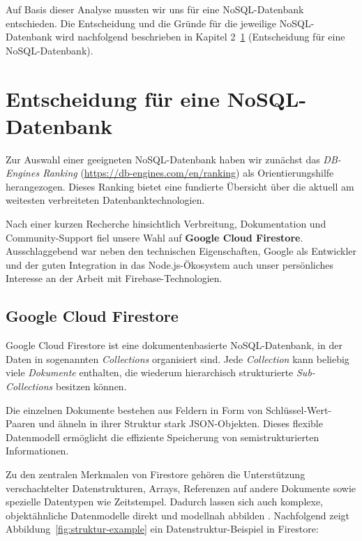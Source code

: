 \documentclass[12pt,a4paper%
              ,oneside     %
              ,titlepage
              ,DIV=13
              ,headinclude
              ,footinclude=false%
              ,cleardoublepage=empty%
              ,parskip=half,
              BCOR=0mm,
              ]{scrreprt}
\begin{document}
Auf Basis dieser Analyse mussten wir uns für eine NoSQL-Datenbank entschieden. Die Entscheidung und die Gründe für die jeweilige NoSQL-Datenbank wird nachfolgend beschrieben in Kapitel 2~\ref{entscheidung-chapter} (\glqq Entscheidung für eine NoSQL-Datenbank\grqq{}).

\chapter{Entscheidung für eine NoSQL-Datenbank}
\label{entscheidung-chapter}

Zur Auswahl einer geeigneten NoSQL-Datenbank haben wir zunächst das \textit{DB-Engines Ranking} (\url{https://db-engines.com/en/ranking}) als Orientierungshilfe herangezogen. Dieses Ranking bietet eine fundierte Übersicht über die aktuell am weitesten verbreiteten Datenbanktechnologien.

Nach einer kurzen Recherche hinsichtlich Verbreitung, Dokumentation und Community-Support fiel unsere Wahl auf \textbf{Google Cloud Firestore}. Ausschlaggebend war neben den technischen Eigenschaften, Google als Entwickler und der guten Integration in das Node.js-Ökosystem auch unser persönliches Interesse an der Arbeit mit Firebase-Technologien.

\section{Google Cloud Firestore}

Google Cloud Firestore ist eine dokumentenbasierte NoSQL-Datenbank, in der Daten in sogenannten \textit{Collections} organisiert sind. Jede \textit{Collection} kann beliebig viele \textit{Dokumente} enthalten, die wiederum hierarchisch strukturierte \textit{Sub-Collections} besitzen können. 

Die einzelnen Dokumente bestehen aus Feldern in Form von Schlüssel-Wert-Paaren und ähneln in ihrer Struktur stark JSON-Objekten. Dieses flexible Datenmodell ermöglicht die effiziente Speicherung von semistrukturierten Informationen.

Zu den zentralen Merkmalen von Firestore gehören die Unterstützung verschachtelter Datenstrukturen, Arrays, Referenzen auf andere Dokumente sowie spezielle Datentypen wie Zeitstempel. Dadurch lassen sich auch komplexe, objektähnliche Datenmodelle direkt und modellnah abbilden \cite{Kesavan.2023, Firebase.2025, FirebaseDatenmodell.2025}. Nachfolgend zeigt Abbildung~\ref{fig:struktur-example} ein Datenstruktur-Beispiel in Firestore:
\end{document}

